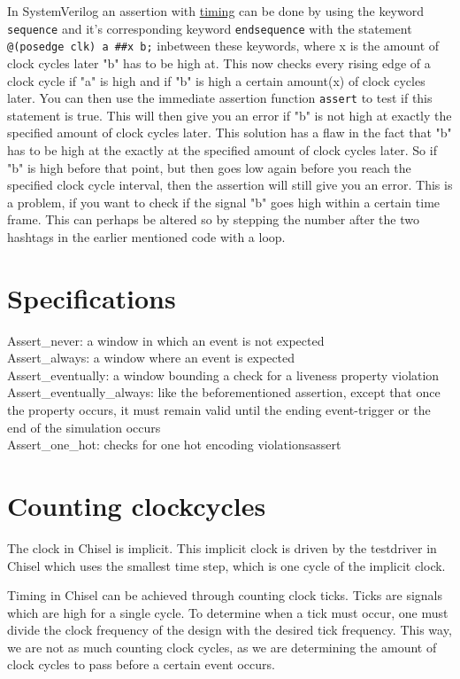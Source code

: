 \documentclass[b5paper]{article}
\begin{document}
In SystemVerilog an assertion with
\href{https://www.chipverify.com/systemverilog/systemverilog-assertions-time-delay}{\color{blue}timing} can be done by using the keyword \texttt{sequence} and it's corresponding keyword \texttt{endsequence} with the statement \texttt{@(posedge clk) a \#\#x b;} inbetween these keywords, where x is the amount of clock cycles later "b" has to be high at. This now checks every rising edge of a clock cycle if "a" is high and if "b" is high a certain amount(x) of clock cycles later. You can then use the immediate assertion function \texttt{assert} to test if this statement is true. This will then give you an error if "b" is not high at exactly the specified amount of clock cycles later.
This solution has a flaw in the fact that "b" has to be high at the exactly at the specified amount of clock cycles later. So if "b" is high before that point, but then goes low again before you reach the specified clock cycle interval, then the assertion will still give you an error. This is a problem, if you want to check if the signal "b" goes high within a certain time frame. This can perhaps be altered so by stepping the number after the two hashtags in the earlier mentioned code with a loop.

\section{Specifications}
Assert\_never: a window in which an event is not expected\\
Assert\_always: a window where an event is expected\\
Assert\_eventually: a window bounding a check for a liveness property violation\\
Assert\_eventually\_always: like the beforementioned assertion, except that once the property occurs, it must remain valid until the ending event-trigger or the end of the simulation occurs\\
Assert\_one\_hot: checks for one hot encoding violationsassert


\section{Counting clockcycles}
The clock in Chisel is implicit. This implicit clock is driven by the testdriver in Chisel which uses the smallest time step, which is one cycle of the implicit clock.

Timing in Chisel can be achieved through counting clock ticks. Ticks are signals which are high for a single cycle. To determine when a tick must occur, one must divide the clock frequency of the design with the desired tick frequency. This way, we are not as much counting clock cycles, as we are determining the amount of clock cycles to pass before a certain event occurs.
\end{document}
